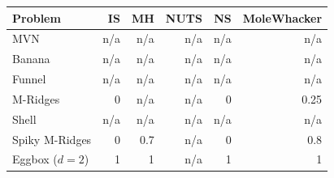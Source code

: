 \begin{tabular}{lrrrrr}
\toprule
Problem & IS & MH & NUTS & NS & MoleWhacker \\
\midrule
MVN & n/a & n/a & n/a & n/a & n/a \\
Banana & n/a & n/a & n/a & n/a & n/a \\
Funnel & n/a & n/a & n/a & n/a & n/a \\
M-Ridges & 0 & n/a & n/a & 0 & 0.25 \\
Shell & n/a & n/a & n/a & n/a & n/a \\
Spiky M-Ridges & 0 & 0.7 & n/a & 0 & 0.8 \\
\midrule
Eggbox ($d=2$) & 1 & 1 & n/a & 1 & 1 \\
\bottomrule
\end{tabular}
